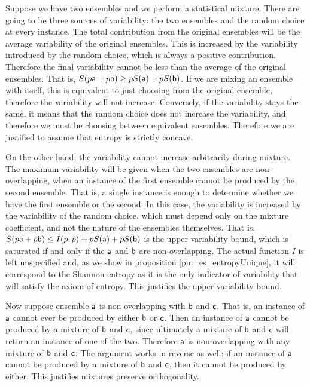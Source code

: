 \begin{mathSection}
\begin{justification}
	Suppose we have two ensembles and we perform a statistical mixture. There are going to be three sources of variability: the two ensembles and the random choice at every instance. The total contribution from the original ensembles will be the average variability of the original ensembles. This is increased by the variability introduced by the random choice, which is always a positive contribution. Therefore the final variability cannot be less than the average of the original ensembles. That is, $S(p\ens[a] + \bar{p} \ens[b]) \geq p S(\ens[a]) + \bar{p} S(\ens[b])$. If we are mixing an ensemble with itself, this is equivalent to just choosing from the original ensemble, therefore the variability will not increase. Conversely, if the variability stays the same, it means that the random choice does not increase the variability, and therefore we must be choosing between equivalent ensembles. Therefore we are justified to assume that entropy is strictly concave.
	
	On the other hand, the variability cannot increase arbitrarily during mixture. The maximum variability will be given when the two ensembles are non-overlapping, when an instance of the first ensemble cannot be produced by the second ensemble. That is, a single instance is enough to determine whether we have the first ensemble or the second. In this case, the variability is increased by the variability of the random choice, which must depend only on the mixture coefficient, and not the nature of the ensembles themselves. That is, $S(p\ens[a] + \bar{p} \ens[b]) \leq I(p, \bar{p}) + p S(\ens[a]) + \bar{p} S(\ens[b])$ is the upper variability bound, which is saturated if and only if the $\ens[a]$ and $\ens[b]$ are non-overlapping. The actual function $I$ is left unspecified and, as we show in proposition \ref{pm_es_entropyUnique}, it will correspond to the Shannon entropy as it is the only indicator of variability that will satisfy the axiom of entropy. This justifies the upper variability bound.
	
	Now suppose ensemble $\ens[a]$ is non-overlapping with $\ens[b]$ and $\ens[c]$. That is, an instance of $\ens[a]$ cannot ever be produced by either $\ens[b]$ or $\ens[c]$. Then an instance of $\ens[a]$ cannot be produced by a mixture of $\ens[b]$ and $\ens[c]$, since ultimately a mixture of $\ens[b]$ and $\ens[c]$ will return an instance of one of the two. Therefore $\ens[a]$ is non-overlapping with any mixture of $\ens[b]$ and $\ens[c]$. The argument works in reverse as well: if an instance of $\ens[a]$ cannot be produced by a mixture of $\ens[b]$ and $\ens[c]$, then it cannot be produced by either. This justifies mixtures preserve orthogonality.
\end{justification}
\end{mathSection}


